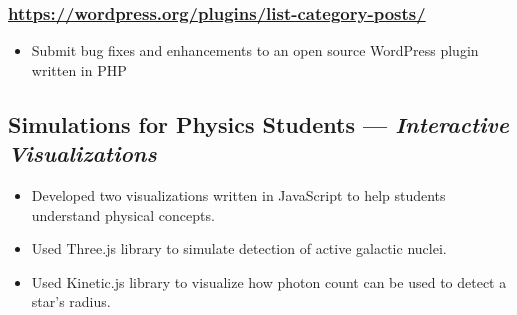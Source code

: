 \documentclass{article}
\begin{document}
\begin{minipage}[t]{.8\textwidth}
\subsubsection*{\href{https://wordpress.org/plugins/list-category-posts/}{https://wordpress.org/plugins/list-category-posts/}}
\begin{itemize}
	\item Submit bug fixes and enhancements to an open source WordPress plugin written in PHP
\end{itemize}
\begin{comment}
\subsection*{Archfeed --- \textit{CLI RSS Reader}}
\subsubsection*{\href{https://github.com/vacuus/archfeed}{https://github.com/vacuus/archfeed}}
\begin{itemize}
	\item RSS reader written in C
	\item Fetches latest news for the Arch Linux distribution.
\end{itemize}
\end{comment}
\subsection*{Simulations for Physics Students --- \textit{Interactive Visualizations}}
\begin{itemize}
	\item Developed two visualizations written in JavaScript to help students understand physical concepts.
	\item Used Three.js library to simulate detection of active galactic nuclei.
	\item Used Kinetic.js library to visualize how photon count can be used to detect a star's radius.
\end{itemize}
\end{minipage}%
\hspace*{0.5cm}
\end{document}
